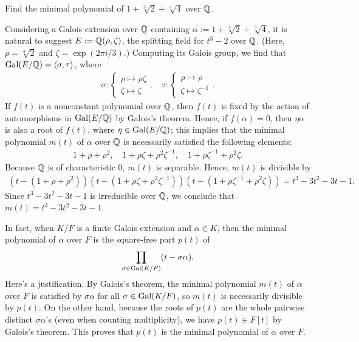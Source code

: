 \begin{prob}
    Find the minimal polynomial of $1+\sqrt[3]{2}+\sqrt[3]{4}$ over ${\mathbb{Q}}$.
\end{prob}
\begin{sol}
    Considering a Galois extension over ${\mathbb{Q}}$ containing $\alpha:=1+\sqrt[3]{2}+\sqrt[3]{4}$, it is natural to suggest $E:={\mathbb{Q}}(\rho, \zeta)$, the splitting field for $t^3-2$ over ${\mathbb{Q}}$. (Here, $\rho=\sqrt[3]{2}$ and $\zeta=\exp(2\pi i/3)$.)
    Computing its Galois group, we find that ${\textrm{Gal}({E/{\mathbb{Q}}})}={\left\langle{\sigma, \tau}\right\rangle}$, where
    \begin{align*}
        \sigma:\left\{\begin{array}{c}
            \rho\mapsto\rho\zeta\\
            \zeta\mapsto\zeta
        \end{array}\right.,\quad
        \tau:\left\{\begin{array}{c}
            \rho\mapsto\rho\\
            \zeta\mapsto\zeta^{-1}
        \end{array}\right..
    \end{align*}
    If $f(t)$ is a nonconstant polynomial over ${\mathbb{Q}}$, then $f(t)$ is fixed by the action of automorphisms in ${\textrm{Gal}({E/{\mathbb{Q}}})}$ by Galois's theorem.
    Hence, if $f(\alpha)=0$, then $\eta\alpha$ is also a root of $f(t)$, where $\eta\in{\textrm{Gal}({E/{\mathbb{Q}}})}$; this implies that the minimal polynomial $m(t)$ of $\alpha$ over ${\mathbb{Q}}$ is necessarily satisfied the following elements:
    \begin{align*}
        1+\rho+\rho^2,\quad 1+\rho\zeta+\rho^2\zeta^{-1},\quad 1+\rho\zeta^{-1}+\rho^2\zeta.
    \end{align*}
    Because ${\mathbb{Q}}$ is of characteristic 0, $m(t)$ is separable.
    Hence, $m(t)$ is divisible by
    \begin{align*}
        (t-(1+\rho+\rho^2))(t-(1+\rho\zeta+\rho^2\zeta^{-1}))(t-(1+\rho\zeta^{-1}+\rho^2\zeta))=t^3-3t^2-3t-1.
    \end{align*}
    Since $t^3-3t^2-3t-1$ is irreducible over ${\mathbb{Q}}$, we conclude that $m(t)=t^3-3t^2-3t-1$.
\end{sol}
\begin{rmk}
    In fact, when $K/F$ is a finite Galois extension and $\alpha\in K$, then the minimal polynomial of $\alpha$ over $F$ is the square-free part $p(t)$ of
    \begin{align*}
        \prod_{\sigma\in{\textrm{Gal}({K/F})}}(t-\sigma\alpha).
    \end{align*}
    Here's a justification.
    By Galois's theorem, the minimal polynomial $m(t)$ of $\alpha$ over $F$ is satisfied by $\sigma\alpha$ for all $\sigma\in{\textrm{Gal}({K/F})}$, so $m(t)$ is necessarily divisible by $p(t)$.
    On the other hand, because the roots of $p(t)$ are the whole pairwise distinct $\sigma\alpha$'s (even when counting multiplicity), we have $p(t)\in F[t]$ by Galois's theorem.
    This proves that $p(t)$ is the minimal polynomial of $\alpha$ over $F$.
\end{rmk}
